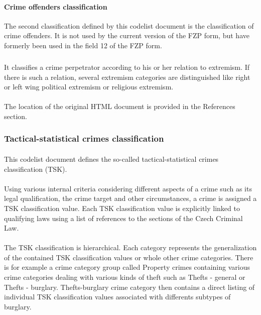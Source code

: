 \paragraph{Crime offenders classification} The second classification defined by this codelist document is the classification of crime offenders. It is not used by the current version of the FZP form, but have formerly been used in the field 12 of the FZP form.
\subparagraph{}
It classifies a crime perpetrator according to his or her relation to extremism. If there is such a relation, several extremism categories are distinguished like right or left wing political extremism or religious extremism.

\paragraph{} The location of the original HTML document is provided in the References section.

\subsubsection{Tactical-statistical crimes classification}\label{sec:tsk}
\paragraph{}
This codelist document defines the so-called tactical-statistical crimes classification (TSK). 
\paragraph{}
Using various internal criteria considering different aspects of a crime such as its legal qualification, the crime target and other circumstances, a crime is assigned a TSK classification value. Each TSK classification value is explicitly linked to qualifying laws using a list of references to the sections of the Czech Criminal Law.
\paragraph{}
The TSK classification is hierarchical. Each category represents the generalization of the contained TSK classification values or whole other crime categories.
There is for example a crime category group called Property crimes containing various crime categories dealing with various kinds of theft such as Thefts - general or Thefts - burglary. Thefts-burglary crime category then contains a direct listing of individual TSK classification values associated with differents subtypes of burglary.

